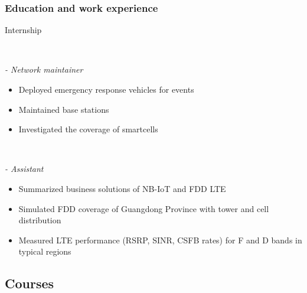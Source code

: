 \documentclass{beamer}
\begin{document}
\begin{frame}
\frametitle{Education and work experience}

\begin{block}{Internship}

\begin{minipage}[t]{0.7\textwidth}
\end{minipage}
~
\begin{minipage}[t]{0.2\textwidth}
\end{minipage}

\textit{  - Network maintainer}

\begin{itemize}
  \item Deployed emergency response vehicles for events
  \item Maintained base stations
  \item Investigated the coverage of smartcells
\end{itemize}



\begin{minipage}[t]{0.7\textwidth}
\end{minipage}
~
\begin{minipage}[t]{0.2\textwidth}
\end{minipage}

\textit{  - Assistant}

\begin{itemize}
  \item Summarized business solutions of NB-IoT and FDD LTE
  \item Simulated FDD coverage of Guangdong Province with tower and cell distribution
  \item Measured LTE performance (RSRP, SINR, CSFB rates) for F and D bands in typical regions
\end{itemize}

\end{block}

\end{frame}



\subsection{Courses}
\end{document}

